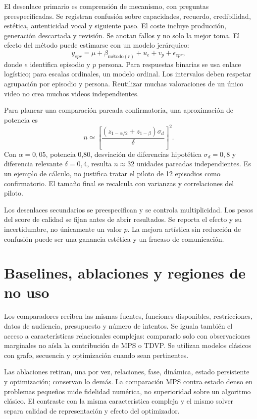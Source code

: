 El desenlace primario es comprensión de mecanismo, con preguntas preespecificadas. Se registran confusión sobre capacidades, recuerdo, credibilidad, estética, autenticidad vocal y siguiente paso. El coste incluye producción, generación descartada y revisión. Se anotan fallos y no solo la mejor toma. El efecto del método puede estimarse con un modelo jerárquico:
\begin{equation}
 y_{epr}=\mu+\beta_{\mathrm{método}(r)}+u_e+v_p+\epsilon_{epr},
\end{equation}
donde $e$ identifica episodio y $p$ persona. Para respuestas binarias se usa enlace logístico; para escalas ordinales, un modelo ordinal. Los intervalos deben respetar agrupación por episodio y persona. Reutilizar muchas valoraciones de un único video no crea muchos videos independientes.

Para planear una comparación pareada confirmatoria, una aproximación de potencia es
\begin{equation}
 n\simeq\left[\frac{(z_{1-\alpha/2}+z_{1-\beta})\sigma_d}{\delta}\right]^2.
\end{equation}
Con $\alpha=0,05$, potencia 0,80, desviación de diferencias hipotética $\sigma_d=0,8$ y diferencia relevante $\delta=0,4$, resulta $n\approx32$ unidades pareadas independientes. Es un ejemplo de cálculo, no justifica tratar el piloto de 12 episodios como confirmatorio. El tamaño final se recalcula con varianzas y correlaciones del piloto.

Los desenlaces secundarios se preespecifican y se controla multiplicidad. Los pesos del score de calidad se fijan antes de abrir resultados. Se reporta el efecto y su incertidumbre, no únicamente un valor $p$. La mejora artística sin reducción de confusión puede ser una ganancia estética y un fracaso de comunicación.

\section{Baselines, ablaciones y regiones de no uso}
Los comparadores reciben las mismas fuentes, funciones disponibles, restricciones, datos de audiencia, presupuesto y número de intentos. Se iguala también el acceso a características relacionales complejas: compararlo solo con observaciones marginales no aísla la contribución de MPS o TDVP. Se utilizan modelos clásicos con grafo, secuencia y optimización cuando sean pertinentes.

Las ablaciones retiran, una por vez, relaciones, fase, dinámica, estado persistente y optimización; conservan lo demás. La comparación MPS contra estado denso en problemas pequeños mide fidelidad numérica, no superioridad sobre un algoritmo clásico. El contraste con la misma característica compleja y el mismo solver separa calidad de representación y efecto del optimizador.


